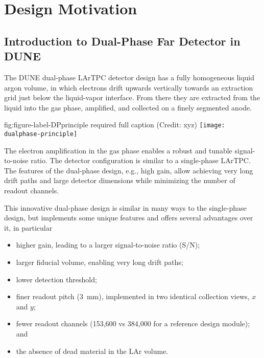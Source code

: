 \chapter{Design Motivation}
\label{ch:fddp-design}

\section{Introduction to Dual-Phase Far Detector in DUNE}
\label{sec:fddp-design-highlight}


The DUNE dual-phase LArTPC detector design 
has a fully homogeneous liquid argon volume, in which electrons
drift upwards vertically towards an extraction grid just below the liquid-vapor interface. From there they
are extracted from the liquid into the gas phase, amplified, and
collected on a finely segmented
anode.


\begin{dunefigure}{fig:figure-label-DPprinciple}
{required full caption (Credit: xyz)}
\texttt{[image: dualphase-principle]}
\end{dunefigure}

The electron amplification in the gas phase enables a robust and tunable signal-to-noise ratio. 
The detector configuration is similar to a single-phase LArTPC. The features of the dual-phase design, e.g., high gain, 
allow achieving very long drift paths and large detector dimensions while minimizing the number of readout channels.


This innovative dual-phase design is similar in many ways to the single-phase design,
but implements some unique features and offers several advantages over it, in particular
\begin{itemize}
\item  higher gain, leading to a larger signal-to-noise ratio (S/N);
\item  larger fiducial volume, enabling very long drift paths;
\item  lower detection threshold;
\item  finer readout pitch (3~mm), implemented in two identical collection views, $x$ and $y$;
\item  fewer readout channels (153,600 vs 384,000 for a reference design  module); and
\item  the absence of dead material in the LAr volume.
\end{itemize}

